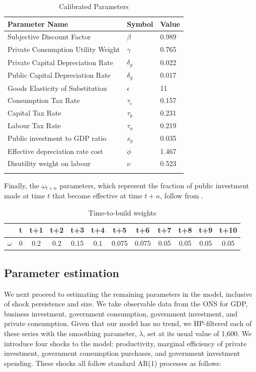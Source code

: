 \documentclass[titlepage, 11pt, a4paper]{article}
\renewcommand{\&}{and}
\begin{document}
\begin{table}[H] 
\centering
\caption{Calibrated Parameters} 
\begin{tabular}{lll}
\toprule
\textbf{Parameter Name} & \textbf{Symbol} & \textbf{Value} \\
\midrule
Subjective Discount Factor & $\beta$ & 0.989 \\
Private Consumption Utility Weight & $\gamma$ & 0.765 \\
Private Capital Depreciation Rate & $\delta_p$ & 0.022 \\
Public Capital Depreciation Rate & $\delta_g$ & 0.017 \\
Goods Elasticity of Substitution & $\epsilon$ & 11 \\
Consumption Tax Rate & $\tau_c$ & 0.157 \\
Capital Tax Rate & $\tau_k$ & 0.231 \\
Labour Tax Rate & $\tau_n$ & 0.219 \\
Public investment to GDP ratio & $s_g$ & 0.035 \\
Effective depreciation rate cost & $\phi$ & 1.467\\
Disutility weight on labour & $\nu$ & 0.523 \\
\bottomrule
 \label{calibrated_params}
\end{tabular}
\end{table}


\par 
Finally, the $\omega_{t+n}$ parameters, which represent the fraction of public investment made at time $t$ that become effective at time $t+n$, follow from \cite{Suresh24}.

\begin{table}[H]
    \centering 
    \caption{Time-to-build weights}
    \begin{tabular}{c|c|c|c|c|c|c|c|c|c|c|c}
    \toprule
       & t & t+1 & t+2 & t+3 & t+4 & t+5 & t+6 & t+7  & t+8 & t+9 & t+10   \\ \toprule
       $\omega$ & 0 & 0.2 & 0.2 & 0.15 & 0.1 & 0.075 & 0.075 & 0.05 & 0.05 & 0.05 & 0.05 \\
    \bottomrule
    \end{tabular}
    \label{tab:my_label}
\end{table}

\subsection{Parameter estimation}
We next proceed to estimating the remaining parameters in the model, inclusive of shock persistence and size. 
We take observable data from the ONS for GDP, business investment, government consumption, government investment, and private consumption. Given that our model has no trend, we HP-filtered each of these series with the smoothing parameter, $\lambda$, set at its usual value of 1,600. 
We introduce four shocks to the model: productivity, marginal efficiency of private investment, government consumption purchases, and government investment spending. These shocks all follow standard AR(1) processes as follows: 
\end{document}
